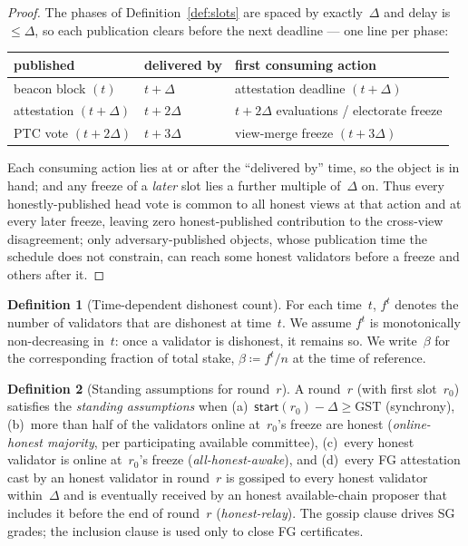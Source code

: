 \ifx\litemode\undefined\documentclass{article}\fi
\newcommand{\start}{\ensuremath{\mathsf{start}}}
\newcommand{\GST}{\ensuremath{\mathrm{GST}}\xspace}
\newcommand{\rzero}{\ensuremath{r_{0}}}                 %
\theoremstyle{plain}
\theoremstyle{definition}
\newtheorem{definition}{Definition}
\theoremstyle{remark}
\begin{document}
\begin{proof}
The phases of Definition~\ref{def:slots} are spaced by exactly~\(\Delta\) and
delay is \(\leq\Delta\), so each publication clears before the next deadline ---
one line per phase:
\begin{center}
\begin{tabular}{@{}lll@{}}
\toprule
published & delivered by & first consuming action \\
\midrule
beacon block \((t)\)       & \(t+\Delta\)  & attestation deadline \((t+\Delta)\) \\
attestation \((t+\Delta)\) & \(t+2\Delta\) & \(t+2\Delta\) evaluations / electorate freeze \\
PTC vote \((t+2\Delta)\)   & \(t+3\Delta\) & view-merge freeze \((t+3\Delta)\) \\
\bottomrule
\end{tabular}
\end{center}
Each consuming action lies at or after the ``delivered by'' time, so the object
is in hand; and any freeze of a \emph{later} slot lies a further multiple
of~\(\Delta\) on.  Thus every honestly-published head vote is common to all
honest views at that action and at every later freeze,
leaving zero honest-published contribution to the cross-view disagreement; only
adversary-published objects, whose publication time the schedule does not
constrain, can reach some honest validators before a freeze and others after
it.
\end{proof}

\begin{definition}[Time-dependent dishonest count]\label{def:f-t}
For each time~$t$, $f^t$ denotes the number of validators that are
dishonest at time~$t$.  We assume $f^t$ is monotonically non-decreasing
in~$t$: once a validator is dishonest, it remains so.  We write~$\beta$ for
the corresponding fraction of total stake, $\beta \coloneqq f^t/n$ at the
time of reference.
\end{definition}

\begin{definition}[Standing assumptions for round~$r$]\label{def:standing}
A round~$r$ (with first slot~$\rzero$) satisfies the \emph{standing
assumptions} when (a)~$\start(\rzero) - \Delta \geq \GST$ (synchrony),
(b)~more than half of the validators online at~$\rzero$'s freeze are honest
(\emph{online-honest majority}, per participating available committee),
(c)~every honest validator is online at~$\rzero$'s freeze
(\emph{all-honest-awake}), and (d)~every FG attestation cast by an honest
validator in round~$r$ is gossiped to every honest validator within~$\Delta$
and is eventually received by an honest available-chain proposer that includes
it before the end of round~$r$ (\emph{honest-relay}).  The gossip clause drives
SG grades; the inclusion clause is used only to close FG certificates.
\end{definition}
\end{document}
